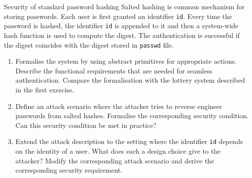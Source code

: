 \documentclass{crypto-exercise}
\begin{document}
\begin{exercise}{Security of standard password hashing}
  Salted hashing is common mechanism for storing passwords. Each
  user is first granted an identifier \texttt{id}. Every time the
  password is hashed, the identifier \texttt{id} is appended to it and
  then a system-wide hash function is used to compute the digest. The
  authentication is successful if the digest coincides with the digest
  stored in \texttt{passwd} file.
  \begin{enumerate}
  \item Formalise the system by using abstract primitives for
    appropriate actions. Describe the functional requirements that are
    needed for seamless authentication. Compare the formalisation with
    the lottery system described in the first exercise.
  \item Define an attack scenario where the attacker tries to reverse
    engineer passwords from salted hashes. Formalise the corresponding
    security condition. Can this security condition be met in
    practice?
  \item Extend the attack description to the setting where the
    identifier \texttt{id} depends on the identity of a user. What
    does such a design choice give to the attacker? Modify the
    corresponding attack scenario and derive the corresponding
    security requirement.
  \end{enumerate}
\end{exercise}
\end{document}
